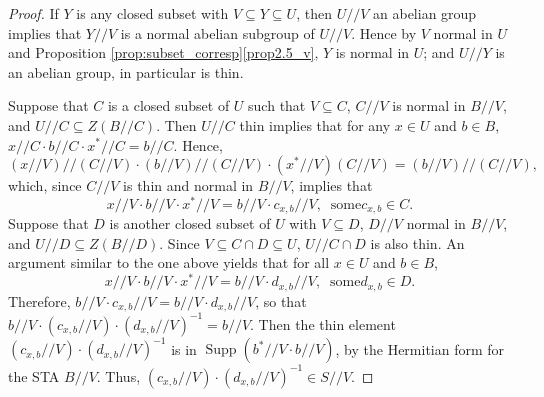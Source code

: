 \documentclass[ALCO,ThmDefs,Unicode,epreuves]{cedram}
\DeclareMathOperator{\Supp}{Supp}
\begin{document}
\begin{proof}
If $Y$ is any closed subset with $V \subseteq Y \subseteq U$, then
$U//V$ an abelian group implies that $Y//V$ is a normal abelian subgroup
of $U//V$. Hence by $V$ normal in $U$ and Proposition
\ref{prop:subset_corresp}\ref{prop2.5_v}, $Y$
is normal in $U$; and $U//Y$ is an abelian group, in particular is thin.

Suppose that $C$ is a closed subset of $U$ such that $V \subseteq C$,
$C//V$ is normal in $B//V$, and $U//C \subseteq Z(B//C)$. Then $U//C$ thin
implies that for any $x \in U$ and $b \in B$, 
$x//C\cdot b//C\cdot x^*//C = b//C$. Hence, 
\[
 (x//V)//(C//V)\cdot
(b//V)//(C//V)\cdot (x^*//V)(C//V) = (b//V)//(C//V),
\] 
which, since $C//V$ is thin and normal in $B//V$, implies that
\[
x//V\cdot b//V\cdot x^*//V = b//V\cdot c_{x,b}//V, \ \mbox{ some
}c_{x,b}
\in C.
\]
Suppose that $D$ is another closed subset of $U$ with $V \subseteq D$,
$D//V$
normal in $B//V$, and $U//D \subseteq Z(B//D)$. 
Since $V \subseteq C\cap D
\subseteq U$, $U//C\cap D$ is also thin. An argument similar to
the one above 
yields that for all $x \in U$ and $b \in B$,
\[
x//V\cdot b//V\cdot x^*//V = b//V\cdot d_{x,b}//V, \ \mbox{ some
}d_{x,b}
\in D.
\]
Therefore, $b//V\cdot c_{x,b}//V = b//V\cdot d_{x,b}//V$, so that $b//V\cdot
(c_{x,b}//V)\cdot (d_{x,b}//V)^{-1} = b//V$. Then the thin element
$(c_{x,b}//V)\cdot (d_{x,b}//V)^{-1}$ is in $\Supp(b^*//V\cdot b//V)$, by the Hermitian
form for the STA $B//V$. Thus, $(c_{x,b}//V)\cdot (d_{x,b}//V)^{-1} \in S//V$. 


\end{proof}
\end{document}
